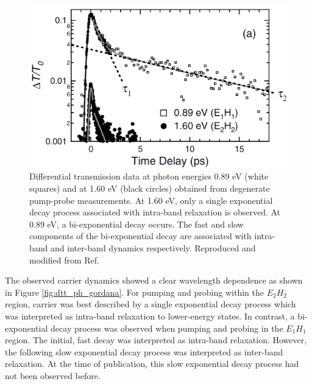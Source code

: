 \begin{figure}[ht]
	\centering
	\includegraphics[scale=0.3]{images/chapter_prior_works/dtt_gordana}
	\caption{Differential transmission data at photon energies 0.89 eV (white squares) and at 1.60 eV (black circles) obtained from degenerate pump-probe measurements. At 1.60 eV, only a single exponential decay process associated with intra-band relaxation is observed. At 0.89 eV, a bi-exponential decay occurs. The fast and slow components of the bi-exponential decay are associated with intra-band and inter-band dynamics respectively. Reproduced and modified from Ref.\ \cite{ostojic2004interband}}
	\label{fig: abs_gordana}
\end{figure}

The observed carrier dynamics showed a clear wavelength dependence as shown in Figure \ref{fig:dtt_ph_gordana}. For pumping and probing within the $E_2 H_2$ region, carrier was best described by a single exponential decay process which was interpreted as intra-band relaxation to lower-energy states. In contrast, a bi-exponential decay process was observed when pumping and probing in the $E_1 H_1$ region. The initial, fast decay was interpreted as intra-band relaxation. However, the following slow exponential decay process was interpreted as inter-band relaxation. At the time of publication, this slow exponential decay process had not been observed before.

